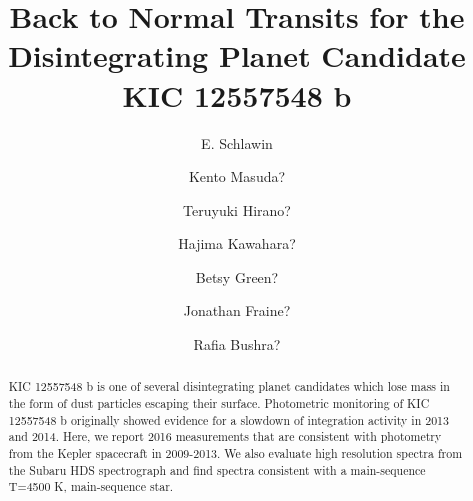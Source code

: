 \documentclass[preprint]{aastex61}
\begin{document}
\title{Back to Normal Transits for the Disintegrating Planet Candidate KIC 12557548 b}



\author{E. Schlawin}

\author{Kento Masuda?}

\author{Teruyuki Hirano?}

\author{Hajima Kawahara?}

\author{Betsy Green?}

\author{Jonathan Fraine?}

\author{Rafia Bushra?}

\begin{abstract}
KIC 12557548 b is one of several disintegrating planet candidates which lose mass in the form of dust particles escaping their surface.
Photometric monitoring of KIC 12557548 b originally showed evidence for a slowdown of integration activity in 2013 and 2014.
Here, we report 2016 measurements that are consistent with photometry from the Kepler spacecraft in 2009-2013.
We also evaluate high resolution spectra from the Subaru HDS spectrograph and find spectra consistent with a main-sequence T=4500 K, main-sequence star.	
\end{abstract}



\end{document}
